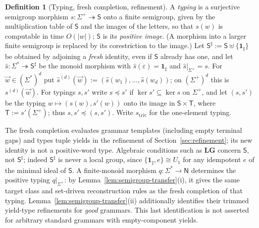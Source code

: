 \documentclass[11pt]{article}
\numberwithin{equation}{section}
\theoremstyle{plain}
\theoremstyle{definition}
\newtheorem{definition}[theorem]{Definition}
\theoremstyle{remark}
\newcommand{\tuple}[1]{\vec{#1}}
\newcommand{\eps}{\varepsilon}
\theoremstyle{plain}
\begin{document}
\begin{definition}[Typing, fresh completion, refinement]
\label{def-monoid-morphism}
\label{def:semigroup-typing}
\label{def:h-refinement}
A \emph{typing} is a surjective semigroup morphism
$s:\Sigma^+\twoheadrightarrow\mathsf S$ onto a finite semigroup, given by the
multiplication table of $\mathsf S$ and the images of the letters, so that
$s(w)$ is computable in time $O(|w|)$; $\mathsf S$ is its \emph{positive
image}.  (A morphism into a larger finite semigroup is replaced by its
corestriction to the image.)  Let $\mathsf S^\sharp:=\mathsf
S\uplus\{\mathbf1_\sharp\}$ be obtained by adjoining a \emph{fresh} identity,
even if $\mathsf S$ already has one, and let
$\widehat{s}:\Sigma^*\twoheadrightarrow\mathsf S^\sharp$ be the monoid morphism
with $\widehat{s}(\eps)=\mathbf1_\sharp$ and $\widehat{s}|_{\Sigma^+}=s$.  For
$\tuple w\in(\Sigma^*)^d$ put
$\widehat{s}^{(d)}(\tuple w):=(\widehat{s}(w_1),\ldots,\widehat{s}(w_d))$; on
$(\Sigma^+)^d$ this is $s^{(d)}(\tuple w)$.  For typings $s,s'$ write $s\preceq
s'$ if $\ker s'\subseteq\ker s$ on $\Sigma^+$, and let $(s,s')$ be the typing
$w\mapsto(s(w),s'(w))$ onto its image in $\mathsf S\times\mathsf T$, where $\mathsf T:=s'(\Sigma^+)$; thus
$s,s'\preceq(s,s')$.  Write $s_{\mathrm{triv}}$ for the one-element typing.
\end{definition}

The fresh completion evaluates grammar templates (including empty
terminal gaps) and types tuple yields in the refinement of
Section~\ref{sec:refinement}; its new identity is not a positive-word type.
Algebraic conditions such as $\mathbf{LG}$ concern $\mathsf S$, not
$\mathsf S^\sharp$; indeed $\mathsf S^\sharp$ is never a local group, since
$\{\mathbf1_\sharp,e\}\cong U_1$ for any idempotent $e$ of the minimal ideal of $\mathsf S$.  A finite-monoid morphism $q:\Sigma^*\to\mathsf N$ determines
the positive typing $q|_{\Sigma^+}$: by
Lemma~\ref{lem:semigroup-transfer}(i), it gives the same target class and
set-driven reconstruction rules as the fresh completion of that typing.
Lemma~\ref{lem:semigroup-transfer}(ii) additionally identifies their
trimmed yield-type refinements for \emph{good} grammars.  This last
identification is not asserted for arbitrary standard grammars with
empty-component yields.
\end{document}
